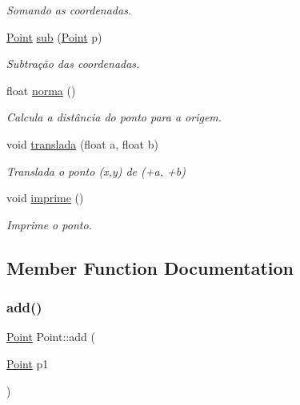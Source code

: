 \begin{DoxyCompactItemize}
\begin{DoxyCompactList}\small\item\em Somando as coordenadas. \end{DoxyCompactList}\item 
\mbox{\hyperlink{class_point}{Point}} \mbox{\hyperlink{class_point_ab1d94b20de98b5e73345599d33145195}{sub}} (\mbox{\hyperlink{class_point}{Point}} p)
\begin{DoxyCompactList}\small\item\em Subtração das coordenadas. \end{DoxyCompactList}\item 
\mbox{\label{class_point_abd2618d1f505d9392893273a66e7c9b2}} 
float \mbox{\hyperlink{class_point_abd2618d1f505d9392893273a66e7c9b2}{norma}} ()
\begin{DoxyCompactList}\small\item\em Calcula a distância do ponto para a origem. \end{DoxyCompactList}\item 
\mbox{\label{class_point_ad9676e36f3444534b609e3c68422239a}} 
void \mbox{\hyperlink{class_point_ad9676e36f3444534b609e3c68422239a}{translada}} (float a, float b)
\begin{DoxyCompactList}\small\item\em Translada o ponto (x,y) de (+a, +b) \end{DoxyCompactList}\item 
\mbox{\label{class_point_a1fb5c2501c27ab2cbc99d06c2a26a741}} 
void \mbox{\hyperlink{class_point_a1fb5c2501c27ab2cbc99d06c2a26a741}{imprime}} ()
\begin{DoxyCompactList}\small\item\em Imprime o ponto. \end{DoxyCompactList}\end{DoxyCompactItemize}


\subsection{Member Function Documentation}
\mbox{\label{class_point_a8a2ee9e0febd224f86391229e77c2aee}} 
\subsubsection{\texorpdfstring{add()}{add()}}
{\footnotesize\ttfamily \mbox{\hyperlink{class_point}{Point}} Point\+::add (\begin{DoxyParamCaption}\item[{\mbox{\hyperlink{class_point}{Point}}}]{p1 }\end{DoxyParamCaption})}



